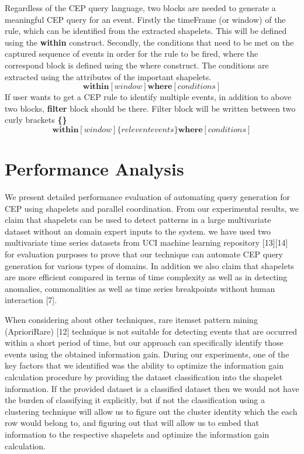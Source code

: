 \documentclass[conference]{IEEEtran}  %
\begin{document}
Regardless of the CEP query language, two blocks are needed to generate a meaningful CEP query for an event. Firstly the timeFrame (or window) of the rule, which can be identified from the extracted shapelets. This will be defined using the \textbf{within} construct. Secondly, the conditions that need to be met on the captured sequence of events in order for the rule to be fired, where the correspond block is defined using the where construct. The conditions are extracted using the attributes of the important shapelets.
\begin{equation}
\textbf{within}[window] \textbf{where}[conditions]
\end{equation}
If user wants to get a CEP rule to identify multiple events, in addition to above two blocks, \textbf{filter} block should be there. Filter block will be written between two curly brackets \textbf{\{\}}
\begin{equation}
\textbf{within}[window] \{relevent events\} \textbf{where}[conditions]
\end{equation}


\section{Performance Analysis}
We present detailed performance evaluation of automating query generation for CEP using shapelets and parallel coordination. From our experimental results, we claim that shapelets can be used to detect patterns in a large multivariate dataset without an domain expert inputs to the system. we have used two multivariate time series datasets from UCI machine learning repository [13][14] for evaluation purposes to prove that our technique can automate CEP query generation for various types of domains. In addition we also claim that shapelets are more efficient compared in terms of time complexity as well as in detecting anomalies, commonalities as well as time series breakpoints without human interaction [7].

When considering about other techniques, rare itemset pattern mining (AprioriRare) [12] technique is not suitable for detecting events that are occurred within a short period of time, but our approach can specifically identify those events using the obtained information gain. During our experiments, one of the key factors that we identified was the ability to optimize the information gain calculation procedure by providing the dataset classification into the shapelet information. If the provided dataset is a classified dataset then we would not have the burden of classifying it explicitly, but if not the classification using a clustering technique will allow us to figure out the cluster identity which the each row would belong to, and figuring out that will allow us to embed that information to the respective shapelets and optimize the information gain calculation. 
\end{document}
